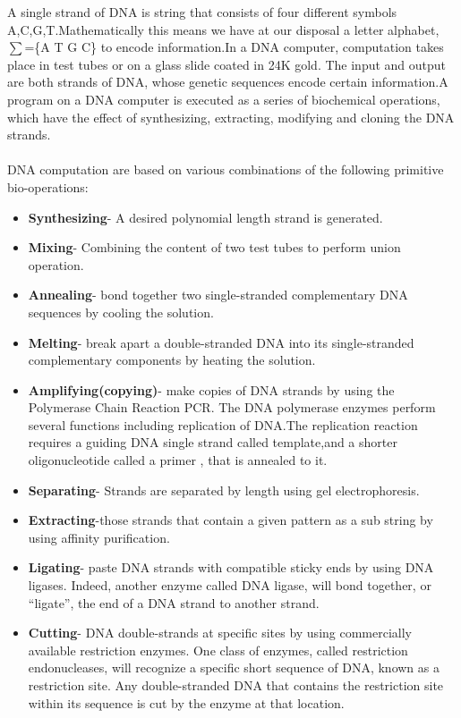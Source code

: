 \documentclass[a4paper]{article}
\begin{document}
A single strand of DNA is string that consists of four different symbols A,C,G,T.Mathematically this means we have at our disposal a  letter alphabet, $\sum$=\{A T G C\} to encode information.In a DNA computer, computation takes place in test tubes or on a glass slide coated in 24K gold. The input and output  are  both strands  of  DNA,  whose  genetic  sequences  encode certain  information.A  program  on  a  DNA  computer  is  executed  as  a series  of  biochemical operations,  which  have  the  effect  of  synthesizing, extracting, modifying and cloning the DNA strands.
\\ \\

DNA computation are based on various combinations of the following primitive bio-operations:
  \begin{itemize}
    \item \textbf{Synthesizing}- A desired polynomial length strand is generated.
        \item \textbf{Mixing}- Combining the content of two test tubes to perform union operation.
        \item \textbf{Annealing}- bond  together  two  single-stranded  complementary  DNA sequences  by  cooling  the  solution.
        \item \textbf{Melting}- break apart a double-stranded DNA into its single-stranded complementary  components  by  heating  the  solution.
         \item \textbf{Amplifying(copying)}- make  copies  of  DNA  strands  by  using  the Polymerase  Chain  Reaction  PCR.  The  DNA  polymerase  enzymes perform several   functions   including replication of DNA.The replication reaction requires a  guiding  DNA  single strand  called template,and  a  shorter  oligonucleotide  called  a primer , that  is annealed to it. 
         \item \textbf{Separating}- Strands are separated by length using gel electrophoresis.
         \item \textbf{Extracting}-those strands that contain a given pattern as a sub string by using affinity purification.
        \item \textbf{Ligating}- paste  DNA  strands  with  compatible  sticky  ends  by  using DNA  ligases.  Indeed,  another  enzyme  called DNA  ligase,  will  bond together, or ``ligate'', the end of a DNA strand to another strand.
        \item \textbf{Cutting}- DNA double-strands at specific sites by using commercially available   restriction   enzymes.   One   class   of   enzymes,   called restriction endonucleases, will recognize a specific short sequence of DNA,  known  as  a  restriction  site.  Any  double-stranded  DNA  that contains the restriction site within its sequence is cut by the enzyme at that location. 

\end{itemize}
\end{document}
